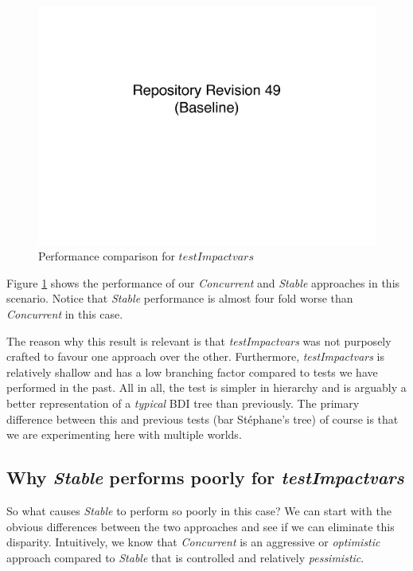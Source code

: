 \documentclass[a4paper]{article}
\newcommand{\cc}{\emph{Concurrent}\xspace}
\newcommand{\st}{\emph{Stable}\xspace}
\newcommand{\tiv}{\emph{testImpactvars}\xspace}
\begin{document}
\begin{figure}[htbp]
   \centering
   \includegraphics[page=10,width=1.0\textwidth]{blak49.pdf}
   \caption{Performance comparison for $testImpactvars$}
   \label{fig:testImpactvarsperformance}
\end{figure}

Figure \ref{fig:testImpactvarsperformance} shows the performance of our \cc and \st approaches in this scenario. Notice that \st performance is almost four fold worse than \cc in this case. 

The reason why this result is relevant is that \tiv was not purposely crafted to favour one approach over the other. Furthermore, \tiv is relatively shallow and has a low branching factor compared to tests we have performed in the past. All in all, the test is simpler in hierarchy and is arguably a better representation of a \emph{typical} BDI tree than previously. The primary difference between this and previous tests (bar St\'ephane's tree) of course is that we are experimenting here with multiple worlds.


\subsection{Why \st performs poorly for \tiv}
\label{subsec:stablePoor}

So what causes \st to perform so poorly in this case? We can start with the obvious differences between the two approaches and see if we can eliminate this disparity. Intuitively, we know that \cc is an aggressive or \emph{optimistic} approach compared to \st that is controlled and relatively \emph{pessimistic}. 
\end{document}
